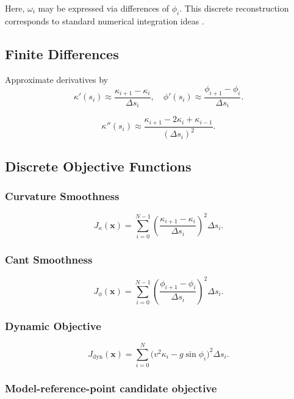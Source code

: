 Here, \(\omega_i\) may be expressed via differences of \(\phi_i\).
This discrete reconstruction corresponds to standard numerical
integration ideas \cite{Hairer1993ODE,Press2007NumericalRecipes}.

\subsection{Finite Differences}

\begin{definition}
Approximate derivatives by
\[
\kappa'(s_i)
\approx
\frac{\kappa_{i+1}-\kappa_i}{\Delta s_i},
\quad
\phi'(s_i)
\approx
\frac{\phi_{i+1}-\phi_i}{\Delta s_i}.
\]
\end{definition}

\begin{definition}
\[
\kappa''(s_i)
\approx
\frac{\kappa_{i+1}-2\kappa_i+\kappa_{i-1}}{(\Delta s_i)^2}.
\]
\end{definition}

\subsection{Discrete Objective Functions}

\subsubsection{Curvature Smoothness}

\[
J_\kappa(\mathbf{x})
=
\sum_{i=0}^{N-1}
\left(
\frac{\kappa_{i+1}-\kappa_i}{\Delta s_i}
\right)^2
\Delta s_i.
\]

\subsubsection{Cant Smoothness}

\[
J_\phi(\mathbf{x})
=
\sum_{i=0}^{N-1}
\left(
\frac{\phi_{i+1}-\phi_i}{\Delta s_i}
\right)^2
\Delta s_i.
\]

\subsubsection{Dynamic Objective}

\[
J_{\mathrm{dyn}}(\mathbf{x})
=
\sum_{i=0}^{N}
\bigl(
v^2 \kappa_i - g \sin\phi_i
\bigr)^2
\Delta s_i.
\]

\subsubsection{Model-reference-point candidate objective}

